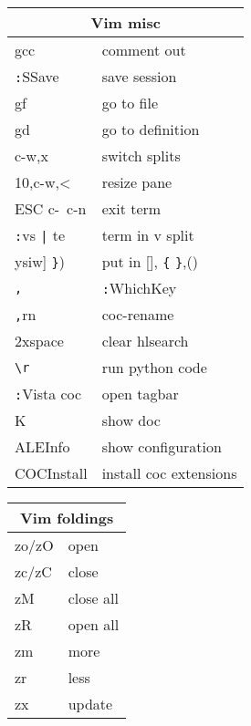 \documentclass[12pt,paper=landscape,paper=a4]{scrartcl}
\begin{document}
\begin{multicols}{3}
    \vspace{1em}

    \begin{tabular}{ll}
        \multicolumn{2}{c}{Vim misc}\\
        \hline
        gcc             & comment out\\
        \verb!:!SSave   & save session\\
        gf              & go to file\\
        gd              & go to definition\\
        c-w,x  	        & switch splits\\
        10,c-w,<        & resize pane\\
        ESC c-\ c-n     & exit term \\
        \verb!:!vs \verb!|! te    & term in v split \\
        ysiw] \verb!}!)     & put in [], \verb!{! \verb!}!,()\\
        \verb!,! 		    & \verb!:!WhichKey\\
        \verb!,!rn          & coc-rename\\
        2xspace             & clear hlsearch\\
        \verb!\r!	        & run python code\\
        \verb!:!Vista coc   & open tagbar\\
        K               & show doc\\
        ALEInfo         & show configuration \\
        COCInstall      & install coc extensions
    \end{tabular}

    \vspace{1em}

    \begin{tabular}{ll}
        \multicolumn{2}{c}{Vim foldings}\\
        \hline
        zo/zO  & open \\
        zc/zC  & close\\
        zM     & close all\\
        zR     & open all\\
        zm     & more\\
        zr     & less\\
        zx     & update\\
    \end{tabular}
\end{multicols}
\end{document}
